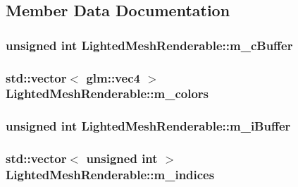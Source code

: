\subsection{Member Data Documentation}
\hypertarget{classLightedMeshRenderable_afd73d691c525f8b5d7f93aa65561f928}{
\subsubsection[{m\+\_\+c\+Buffer}]{\setlength{\rightskip}{0pt plus 5cm}unsigned int Lighted\+Mesh\+Renderable\+::m\+\_\+c\+Buffer\hspace{0.3cm}{\ttfamily [private]}}}\label{classLightedMeshRenderable_afd73d691c525f8b5d7f93aa65561f928}
\hypertarget{classLightedMeshRenderable_ac22bb908efafa4720767615e7eab7bf9}{
\subsubsection[{m\+\_\+colors}]{\setlength{\rightskip}{0pt plus 5cm}std\+::vector$<$ glm\+::vec4 $>$ Lighted\+Mesh\+Renderable\+::m\+\_\+colors\hspace{0.3cm}{\ttfamily [private]}}}\label{classLightedMeshRenderable_ac22bb908efafa4720767615e7eab7bf9}
\hypertarget{classLightedMeshRenderable_adc7552281a74337733996a2812fe1fa6}{
\subsubsection[{m\+\_\+i\+Buffer}]{\setlength{\rightskip}{0pt plus 5cm}unsigned int Lighted\+Mesh\+Renderable\+::m\+\_\+i\+Buffer\hspace{0.3cm}{\ttfamily [private]}}}\label{classLightedMeshRenderable_adc7552281a74337733996a2812fe1fa6}
\hypertarget{classLightedMeshRenderable_af2bb140e6238e4740cb2b59efb431801}{
\subsubsection[{m\+\_\+indices}]{\setlength{\rightskip}{0pt plus 5cm}std\+::vector$<$ unsigned int $>$ Lighted\+Mesh\+Renderable\+::m\+\_\+indices\hspace{0.3cm}{\ttfamily [private]}}}\label{classLightedMeshRenderable_af2bb140e6238e4740cb2b59efb431801}
